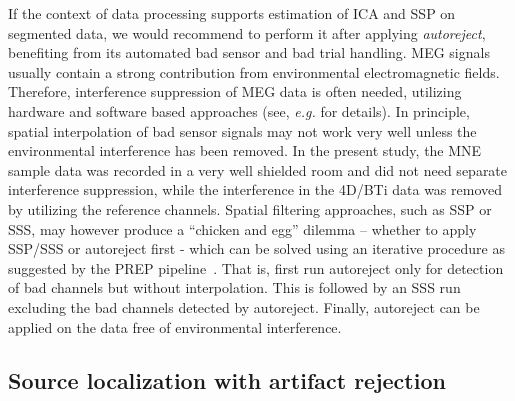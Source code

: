 If the context of data processing supports estimation of ICA and \ac{SSP} on segmented data, we would recommend to perform it after applying \emph{autoreject}, benefiting from its automated bad sensor and bad trial handling. MEG signals usually contain a strong contribution from environmental electromagnetic fields. Therefore, interference suppression of MEG data is often needed, utilizing hardware and software based approaches (see, \textit{e.g.} \citet{parkkonen:2010} for details). In principle, spatial interpolation of bad sensor signals may not work very well unless the environmental interference has been removed. In the present study, the MNE sample data was recorded in a very well shielded room and did not need separate interference suppression, while the interference in the 4D/BTi data was removed by utilizing the reference channels. Spatial filtering approaches, such as SSP or SSS, may however produce a ``chicken and egg'' dilemma -- whether to apply SSP/SSS or autoreject first - which can be solved using an iterative procedure as suggested by the PREP pipeline~\citep{bigdely2015prep}. That is, first run autoreject only for detection of bad channels but without interpolation. This is followed by an SSS run excluding the bad channels detected by autoreject. Finally, autoreject can be applied on the data free of environmental interference.

\subsection{Source localization with artifact rejection}

